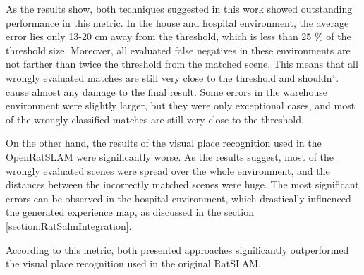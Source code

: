 As the results show, both techniques suggested in this work showed outstanding performance in this metric. In the house and hospital environment, the average error lies only 13-20 cm away from the threshold, which is less than 25 \% of the threshold size. Moreover, all evaluated false negatives in these environments are not farther than twice the threshold from the matched scene. This means that all wrongly evaluated matches are still very close to the threshold and shouldn't cause almost any damage to the final result. Some errors in the warehouse environment were slightly larger, but they were only exceptional cases, and most of the wrongly classified matches are still very close to the threshold.\par
On the other hand, the results of the visual place recognition used in the OpenRatSLAM were significantly worse. As the results suggest, most of the wrongly evaluated scenes were spread over the whole environment, and the distances between the incorrectly matched scenes were huge. The most significant errors can be observed in the hospital environment, which drastically influenced the generated experience map, as discussed in the section \ref{section:RatSalmIntegration}.\par
According to this metric, both presented approaches significantly outperformed the visual place recognition used in the original RatSLAM.

